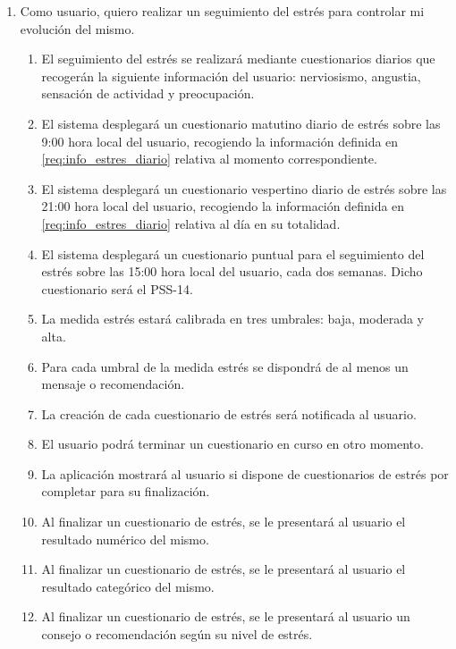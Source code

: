         \begin{enumerate}[series=req-usuario,label=\textbf{\texttt{RU-\arabic*}}]
            \item Como usuario, quiero realizar un seguimiento del estrés para controlar mi evolución del mismo.
            \begin{enumerate}[series=req-funcionales,label=\textbf{\texttt{RF-\arabic*}}]
                \item \label{req:info_estres_diario} El seguimiento del estrés se realizará mediante cuestionarios diarios que recogerán la siguiente información del usuario: nerviosismo, angustia, sensación de actividad y preocupación.
                \item El sistema desplegará un cuestionario matutino diario de estrés sobre las 9:00 hora local del usuario, recogiendo la información definida en \ref{req:info_estres_diario} relativa al momento correspondiente.
                \item  El sistema desplegará un cuestionario vespertino diario de estrés sobre las 21:00 hora local del usuario, recogiendo la información definida en \ref{req:info_estres_diario} relativa al día en su totalidad.
                \item El sistema desplegará un cuestionario puntual para el seguimiento del estrés sobre las 15:00 hora local del usuario, cada dos semanas. Dicho cuestionario será el PSS-14.
                \item La medida estrés estará calibrada en tres umbrales: baja, moderada y alta.
                \item Para cada umbral de la medida estrés se dispondrá de al menos un mensaje o recomendación.
                \item La creación de cada cuestionario de estrés será notificada al usuario.
                \item El usuario podrá terminar un cuestionario en curso en otro momento.
                \item La aplicación mostrará al usuario si dispone de cuestionarios de estrés por completar para su finalización.
                \item Al finalizar un cuestionario de estrés, se le presentará al usuario el resultado numérico del mismo.
                \item Al finalizar un cuestionario de estrés, se le presentará al usuario el resultado categórico del mismo.
                \item Al finalizar un cuestionario de estrés, se le presentará al usuario un consejo o recomendación según su nivel de estrés.
            \end{enumerate}
        \end{enumerate}

